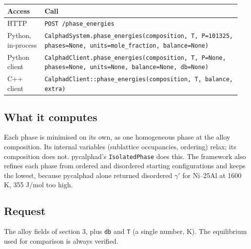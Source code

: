\documentclass[12pt,a4paper]{article}
\begin{document}
\begingroup\small
\begin{longtable}{>{\raggedright\arraybackslash}p{0.155\linewidth}>{\raggedright\arraybackslash}p{0.792\linewidth}}
\toprule
\textbf{Access} & \textbf{Call} \\
\midrule
\endhead
HTTP & \texttt{POST /\allowbreak{}phase\_\allowbreak{}energies} \\
Python, in-process & \texttt{CalphadSystem.\allowbreak{}phase\_\allowbreak{}energies(composition,\allowbreak{} T,\allowbreak{} P=101325,\allowbreak{} phases=None,\allowbreak{} units=\textquotedbl{}mole\_\allowbreak{}fraction\textquotedbl{},\allowbreak{} balance=None)} \\
Python client & \texttt{CalphadClient.\allowbreak{}phase\_\allowbreak{}energies(composition,\allowbreak{} T,\allowbreak{} P=None,\allowbreak{} phases=None,\allowbreak{} units=None,\allowbreak{} balance=None,\allowbreak{} db=None)} \\
C++ client & \texttt{CalphadClient::phase\_\allowbreak{}energies(composition,\allowbreak{} T,\allowbreak{} balance,\allowbreak{} extra)} \\
\bottomrule
\end{longtable}
\endgroup

\subsection*{What it computes}
Each phase is minimised on its own, as one homogeneous phase at the alloy composition. Its internal variables (sublattice occupancies, ordering) relax; its composition does not. pycalphad's \texttt{IsolatedPhase} does this. The framework also refines each phase from ordered and disordered starting configurations and keeps the lowest, because pycalphad alone returned disordered \(\gamma '\) for Ni--25Al at 1600 K, 355 J/mol too high.


\subsection*{Request}
The alloy fields of section 3, plus \texttt{db} and \texttt{T} (a single number, K). The equilibrium used for comparison is always verified.


\end{document}
